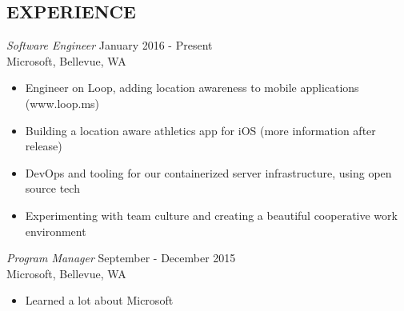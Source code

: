 \documentclass[margin,4pt]{res} %
\begin{document}
\address{virajosinha@gmail.com\\ vsinha.com \\ %
github.com/vsinha}
\address{1451 20th Ave\\ Seattle, WA 98122\\(408) 505-1275}


\begin{resume}



 
\section{EXPERIENCE} 
	{\sl Software Engineer} \hfill January 2016 - Present\\
		Microsoft, Bellevue, WA
		\begin{itemize} \itemsep -2pt
		\item Engineer on Loop, adding location awareness to mobile applications (www.loop.ms)
		\item Building a location aware athletics app for iOS (more information after release)
		\item DevOps and tooling for our containerized server infrastructure, using open source tech
		\item Experimenting with team culture and creating a beautiful cooperative work environment
		\end{itemize}

	{\sl Program Manager} \hfill September - December 2015\\
		Microsoft, Bellevue, WA
		\begin{itemize} \itemsep -2pt
		\item Learned a lot about Microsoft
		\end{itemize}


\end{resume}
\end{document}
